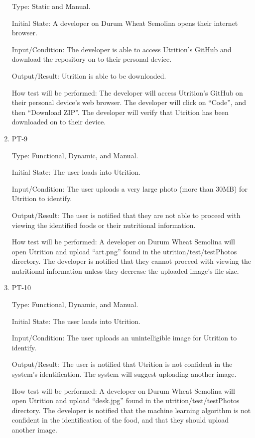 \documentclass[12pt, titlepage]{article}
\begin{document}
\begin{enumerate}
		Type: Static and Manual.
		
		Initial State: A developer on Durum Wheat Semolina opens their internet browser.
		
		Input/Condition: The developer is able to access Utrition’s  \href{https://github.com/jeff-rey-wang/utrition}{GitHub} and download the repository on to their personal device.
		
		Output/Result: Utrition is able to be downloaded.
		
		How test will be performed: The developer will access Utrition’s GitHub on their personal device’s web browser. The developer will click on “Code”, and then “Download ZIP”. The developer will verify that Utrition has been downloaded on to their device.
		
		\item{PT-9} 
		
		Type: Functional, Dynamic, and Manual.
		
		Initial State: The user loads into Utrition.
		
		Input/Condition: The user uploads a very large photo (more than 30MB) for Utrition to identify.
		
		Output/Result: The user is notified that they are not able to proceed with viewing the identified foods or their nutritional information.
		
		How test will be performed: A developer on Durum Wheat Semolina will open Utrition and upload “art.png” found in the utrition/test/testPhotos directory. The developer is notified that they cannot proceed with viewing the nutritional information unless they decrease the uploaded image’s file size.
		
		\item{PT-10} 
		
		Type: Functional, Dynamic, and Manual.
		
		Initial State: The user loads into Utrition.
		
		Input/Condition: The user uploads an unintelligible image for Utrition to identify.
		
		Output/Result: The user is notified that Utrition is not confident in the system’s identification. The system will suggest uploading another image.
		
		How test will be performed: A developer on Durum Wheat Semolina will 
		open Utrition and upload “desk.jpg” found in the utrition/test/testPhotos directory. The developer 
		is notified that the machine learning algorithm is not confident in the 
		identification of the food, and that they should upload another image.
		

\end{enumerate}
\end{document}
